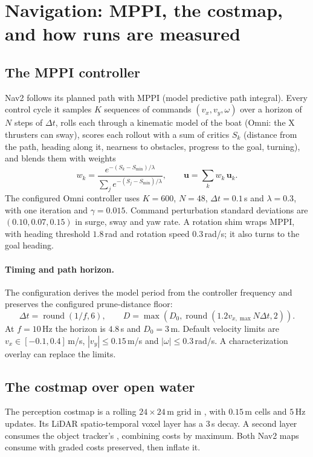 \section{Navigation: MPPI, the costmap, and how runs are measured}
\label{sec:nav}

\subsection{The MPPI controller}

Nav2 follows its planned path with MPPI (model predictive path integral). Every
control cycle it samples $K$ sequences of commands $(v_x, v_y, \omega)$ over a
horizon of $N$ steps of $\Delta t$, rolls each through a kinematic model of the
boat (Omni: the X thrusters can sway), scores each rollout with a sum of critics
$S_k$ (distance from the path, heading along it, nearness to obstacles, progress to
the goal, turning), and blends them with weights
\[
  w_k = \frac{e^{-(S_k - S_{\min})/\lambda}}{\sum_j e^{-(S_j - S_{\min})/\lambda}},
  \qquad \bm u = \sum_k w_k\,\bm u_k .
\]
The configured Omni controller uses $K=600$, $N=48$, $\Delta t=0.1$\,s
and $\lambda=0.3$, with one iteration and $\gamma=0.015$. Command perturbation
standard deviations are $(0.10,0.07,0.15)$ in surge, sway and yaw rate.
A rotation shim wraps MPPI, with heading threshold $1.8$\,rad and rotation
speed $0.3$\,rad/s; it also turns to the goal heading.

\paragraph{Timing and path horizon.} The configuration derives the model period
from the controller frequency and preserves the configured prune-distance floor:
\[
 \Delta t=\operatorname{round}(1/f,6),\qquad
 D=\max\!\left(D_0,\operatorname{round}(1.2v_{x,\max}N\Delta t,2)\right).
\]
At $f=10$\,Hz the horizon is $4.8$\,s and $D_0=3$\,m. Default velocity
limits are $v_x\in[-0.1,0.4]$\,m/s, $|v_y|\le0.15$\,m/s and
$|\omega|\le0.3$\,rad/s. A characterization overlay can replace the limits.

\subsection{The costmap over open water}

The perception costmap is a rolling $24\times24$\,m grid in ,
with $0.15$\,m cells and $5$\,Hz updates. Its LiDAR spatio-temporal voxel
layer has a $3$\,s decay. A second layer consumes the object tracker's
, combining costs by maximum. Both Nav2 maps
consume  with graded costs preserved, then inflate it.

